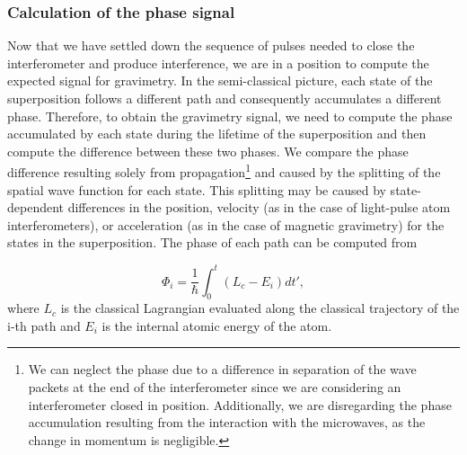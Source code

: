 \documentclass{article}
\begin{document}
\subsubsection{Calculation of the phase signal}
Now that we have settled down the sequence of pulses needed to close the interferometer and produce interference, we are in a position to compute the expected signal for gravimetry. In the semi-classical picture, each state of the superposition follows a different path and consequently accumulates a different phase. Therefore, to obtain the gravimetry signal, we need to compute the phase accumulated by each state during the lifetime of the superposition and then compute the difference between these two phases. We compare the phase difference resulting solely from propagation\footnote{We can neglect the phase due to a difference in separation of the wave packets at the end of the interferometer since we are considering an interferometer closed in position. Additionally, we are disregarding the phase accumulation resulting from the interaction with the microwaves, as the change in momentum is negligible.} and caused by the splitting of the spatial wave function for each state. This splitting may be caused by state-dependent differences in the position, velocity (as in the case of light-pulse atom interferometers), or acceleration (as in the case of magnetic gravimetry) for the states in the superposition. The phase of each path can be computed from \cite{kasevich_light-pulse-atom-interferometry}

\begin{equation}
\label{phasepath}
\Phi_i = \frac{1}{\hbar} \int_{0}^{t} (L_{c} - E_{i}) dt',
\end{equation}
%
where $L_{c}$ is the classical Lagrangian evaluated along the classical trajectory of the i-th path and $E_{i}$ is the internal atomic energy of the atom.
\end{document}
